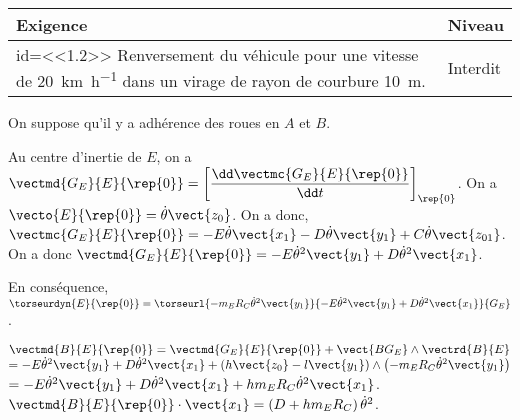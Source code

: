\begin{multicols}{2}
\begin{center}
\begin{tabular}{|p{.7\linewidth}|p{.2\linewidth}|}
\hline 
Exigence & Niveau \\
\hline
id=<<1.2>> Renversement du véhicule pour une vitesse de \SI{20}{km.h^{-1}} dans un virage de rayon de courbure \SI{10}{m}.
& Interdit \\
\hline
\end{tabular}
\end{center}

\begin{hypo}
On suppose qu’il y a adhérence des roues en $A$ et $B$.
\end{hypo}
\fi

\ifnormal
{}
\else
\fi
\ifprof
\begin{corrige}
Au centre d'inertie de $E$, on a $\vectmd{G_E}{E}{\rep{0}}=\left[\dfrac{\dd \vectmc{G_E}{E}{\rep{0}}}{\dd t}\right]_{\rep{0}}$. On a $\vecto{E}{\rep{0}}=\dot{\theta}\vect{z_0}$. On a donc, $ \vectmc{G_E}{E}{\rep{0}}=-E\dot{\theta}\vect{x_1}-D\dot{\theta}\vect{y_1}+C\dot{\theta}\vect{z_{01}}$.
On a donc $\vectmd{G_E}{E}{\rep{0}}=-E\dot{\theta}^2\vect{y_1}+D\dot{\theta}^2\vect{x_1}$.

En conséquence, $\torseurdyn{E}{\rep{0}}=\torseurl{-m_E R_C\dot{\theta}^2\vect{y_1}}{-E\dot{\theta}^2\vect{y_1}+D\dot{\theta}^2\vect{x_1}}{G_E}$.
\end{corrige}
\else
\fi

\ifnormal
{}
\else
\fi

\ifprof
\begin{corrige}
$\vectmd{B}{E}{\rep{0}}=\vectmd{G_E}{E}{\rep{0}}+\vect{BG_E}\wedge\vectrd{B}{E}$ $=-E\dot{\theta}^2\vect{y_1}+D\dot{\theta}^2\vect{x_1}+\left( h \vect{z_0}-l\vect{y_1}\right) \wedge \left( {-m_E R_C\dot{\theta}^2\vect{y_1}} \right)$
$=-E\dot{\theta}^2\vect{y_1}+D\dot{\theta}^2\vect{x_1}+ h m_E R_C\dot{\theta}^2\vect{x_1}$.
$\vectmd{B}{E}{\rep{0}}\cdot \vect{x_1}=\left(D+ h m_E R_C\right)\dot{\theta}^2$.


\end{corrige}
\end{multicols}

